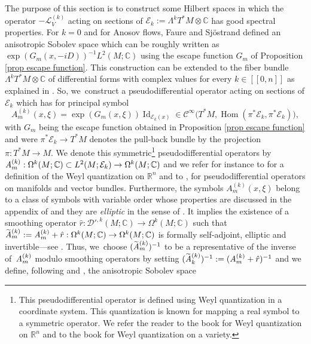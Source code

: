\documentclass[JEP,XML,SOM,Unicode,NoEqCountersInSection,NoFloatCountersInSection,published]{cedram}
\newcommand{\lcr}{[\![}
\newcommand{\rcr}{]\!]}
\theoremstyle{definition}
\theoremstyle{plain}
\newcommand{\A}{\emph{A}}
\newcommand{\Ccal}{\mathcal{C}}
\newcommand{\C}{\mathbb{C}}
\newcommand{\D}{\mathcal{D}}
\newcommand{\Ecal}{\mathcal{E}}
\newcommand{\Lie}{\mathcal{L}}
\newcommand{\R}{\mathbb{R}}
\DeclareMathOperator{\Id}{Id}
\DeclareMathOperator{\Hom}{Hom}
\begin{document}
The purpose of this section is to construct some Hilbert spaces in which the operator $-\Lie_V^{(k)}$ acting on sections of $\Ecal_k:= \Lambda^k T^*M \otimes \C$ has good spectral properties. For $k = 0$ and for Anosov flows, Faure and Sjöstrand defined an anisotropic Sobolev space which can be roughly written as $\exp (G_m (x,-iD))^{-1} L^2 (M ; \C)$ using the escape function $G_m$ of Proposition \ref{prop escape function}. This construction can be extended to the fiber bundle $ \Lambda^k T^*M \otimes \C$ of differential forms with complex values for every $k\in\lcr0,n\rcr$ as explained in \cite{dyatlov-zworski}. So, we~construct a pseudodifferential operator acting on sections of $\Ecal_k$ which has for principal symbol\enlargethispage{\baselineskip}
\[
A_m^{(k)} (x,\xi) = \exp (G_m (x,\xi))\Id_{\Ecal_k (x)} \in \Ccal^{\infty} \bigl(T^*M, \Hom (\pi^* \Ecal_k, \pi^* \Ecal_k) \bigr),
\]
with $G_m$ being the escape function obtained in Proposition \ref{prop escape function} and were $\pi^* \Ecal_k \to T^* M$ denotes the pull-back bundle by the projection $\pi: T^* M \to M$. We denote this symmetric\footnote{This pseudodifferential operator is defined using Weyl quantization in a coordinate system. This quantization is known for mapping a real symbol to a symmetric operator. We refer the reader to the book \cite[Chap.\,4, Th.\,4.1]{zworski} for Weyl quantization on $\R^n$ and to the book \cite[App.\,E]{DZ-book} for Weyl quantization on a variety.} pseudodifferential operators by $\A_m^{(k)}: \Omega^k (M ; \C) \subset L^2 (M; \Ecal_k) \to \Omega^k (M ; \C) $ and we refer for instance to \cite[Chap.\,4, p.\,56]{zworski} for a definition of the Weyl quantization on $\R^n$ and to \cite[App.\,C.1, p.\,29]{dyatlov-zworski},\cite[\S 9.2 p.\,40]{DRI} for pseudodifferential operators on manifolds and vector bundles. Furthermore, the symbols $A_m^{(k)} (x,\xi) $ belong to a class of symbols with variable order whose properties are discussed in the appendix of \cite{FRS} and they are \emph{elliptic} in the sense of \cite[Def.\,8, p.\,40]{FRS}. It implies the existence of a smoothing operator $\hat{r}: \D'^{,k} (M;\C) \to \Omega^k (M; \C)$ such that $\widetilde{\A}{}_m^{(k)}:= \A_m^{(k)} + \hat{r}: \Omega^k (M; \C) \to \Omega^k (M; \C)$ is formally self-adjoint, elliptic and invertible---see \cite[Lem.\,12, p.\,42]{FRS}. Thus, we~choose $(\widetilde{\A}{}_m^{(k)})^{-1}$ to be a representative of the inverse of~$\A_m^{(k)}$ modulo smoothing operators by setting $(\widetilde{\A}{}_k^{(k)})^{-1}:= (\A_m^{(k)} + \hat{r})^{-1}$ and we define, following \cite{FRS} and \cite{FS}, the anisotropic Sobolev space
\end{document}
